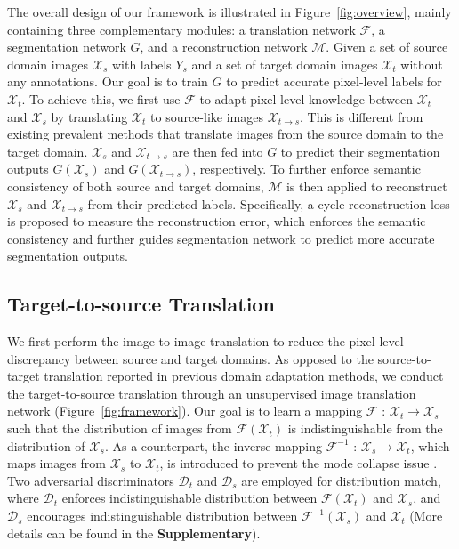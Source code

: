 \documentclass[runningheads]{llncs}
\begin{document}
	The overall design of our framework is illustrated in Figure~\ref{fig:overview}, mainly containing three complementary modules: a translation network $ \mathcal{F} $, a segmentation network $ G $, and a reconstruction network $ \mathcal{M} $. Given a set of source domain images $ \mathcal{X}_s $ with labels $ Y_s $ and a set of target domain images $ \mathcal{X}_t $ without any annotations. Our goal is to train $ G $ to predict accurate pixel-level labels for $ \mathcal{X}_t $. To achieve this, we first use $ \mathcal{F} $ to adapt pixel-level knowledge between $ \mathcal{X}_t $ and $ \mathcal{X}_s $ by translating $ \mathcal{X}_t $ to source-like images $ \mathcal{X}_{t{\rightarrow}s} $. This is different from existing prevalent methods that translate images from the source domain to the target domain. $ \mathcal{X}_s $ and $ \mathcal{X}_{t{\rightarrow}s} $ are then fed into $ G $ to predict their segmentation outputs $ G(\mathcal{X}_s) $ and $ G(\mathcal{X}_{t{\rightarrow}s}) $, respectively. To further enforce semantic consistency of both source and target domains, $ \mathcal{M} $ is then applied to reconstruct $ \mathcal{X}_s $ and $ \mathcal{X}_{t{\rightarrow}s} $ from their predicted labels. Specifically, a cycle-reconstruction loss is proposed to measure the reconstruction error, which enforces the semantic consistency and further guides segmentation network to predict more accurate segmentation outputs. 
	


	\subsection{Target-to-source Translation}


	We first perform the image-to-image translation to reduce the pixel-level discrepancy between source and target domains. As opposed to the source-to-target translation reported in previous domain adaptation methods, we conduct the target-to-source translation through an unsupervised image translation network (Figure~\ref{fig:framework}). Our goal is to learn a mapping $ \mathcal{F} $ : $ \mathcal{X}_t{\rightarrow}\mathcal{X}_s $ such that the distribution of images from $ \mathcal{F}(\mathcal{X}_t) $ is indistinguishable from the distribution of $ \mathcal{X}_s $. As a counterpart, the inverse mapping $ \mathcal{F}^{-1} $ : $ \mathcal{X}_s{\rightarrow}\mathcal{X}_t $, which maps images from $ \mathcal{X}_s $ to $ \mathcal{X}_t $, is introduced to prevent the mode collapse issue \cite{goodfellow2016nips}. Two adversarial discriminators $ \mathcal{D}_t $ and $ \mathcal{D}_s $ are employed for distribution match, where $ \mathcal{D}_t $ enforces indistinguishable distribution between $ \mathcal{F}(\mathcal{X}_t) $ and $ \mathcal{X}_s $, and $ \mathcal{D}_s $ encourages indistinguishable distribution between $ \mathcal{F}^{-1}(\mathcal{X}_s) $ and $ \mathcal{X}_t $ (More details can be found in the \textbf{Supplementary}).
	
\end{document}
